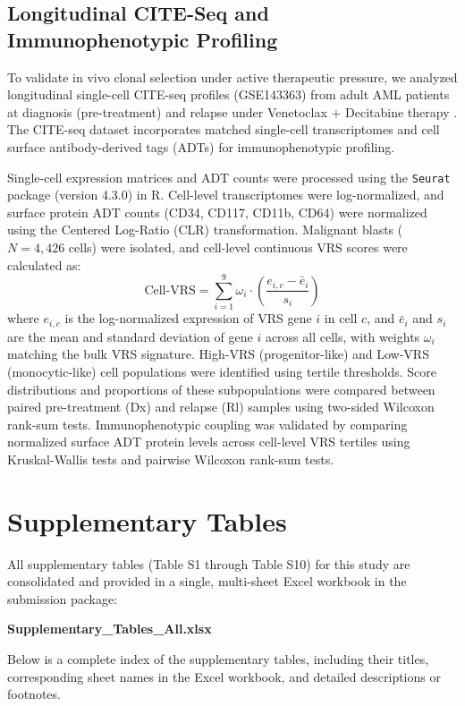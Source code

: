 \documentclass[11pt,a4paper]{article}
\begin{document}
\subsection{Longitudinal CITE-Seq and Immunophenotypic Profiling}
To validate in vivo clonal selection under active therapeutic pressure, we analyzed longitudinal single-cell CITE-seq profiles (GSE143363) from adult AML patients at diagnosis (pre-treatment) and relapse under Venetoclax + Decitabine therapy \cite{pei2020monocytic}. The CITE-seq dataset incorporates matched single-cell transcriptomes and cell surface antibody-derived tags (ADTs) for immunophenotypic profiling. 

Single-cell expression matrices and ADT counts were processed using the \texttt{Seurat} package (version 4.3.0) in R. Cell-level transcriptomes were log-normalized, and surface protein ADT counts (CD34, CD117, CD11b, CD64) were normalized using the Centered Log-Ratio (CLR) transformation. Malignant blasts ($N=4,426$ cells) were isolated, and cell-level continuous VRS scores were calculated as:
\begin{equation}
\text{Cell-VRS} = \sum_{i=1}^{9} \omega_i \cdot \left( \frac{e_{i,c} - \bar{e}_i}{s_i} \right)
\end{equation}
where $e_{i,c}$ is the log-normalized expression of VRS gene $i$ in cell $c$, and $\bar{e}_i$ and $s_i$ are the mean and standard deviation of gene $i$ across all cells, with weights $\omega_i$ matching the bulk VRS signature. High-VRS (progenitor-like) and Low-VRS (monocytic-like) cell populations were identified using tertile thresholds. Score distributions and proportions of these subpopulations were compared between paired pre-treatment (Dx) and relapse (Rl) samples using two-sided Wilcoxon rank-sum tests. Immunophenotypic coupling was validated by comparing normalized surface ADT protein levels across cell-level VRS tertiles using Kruskal-Wallis tests and pairwise Wilcoxon rank-sum tests.

\section{Supplementary Tables}

All supplementary tables (Table S1 through Table S10) for this study are consolidated and provided in a single, multi-sheet Excel workbook in the submission package:
\begin{center}
    \textbf{Supplementary\_Tables\_All.xlsx}
\end{center}
Below is a complete index of the supplementary tables, including their titles, corresponding sheet names in the Excel workbook, and detailed descriptions or footnotes.
\end{document}
